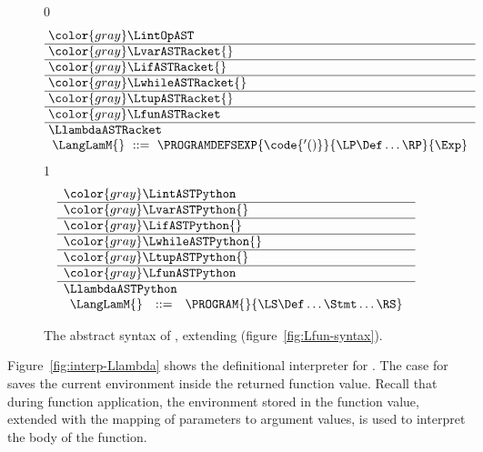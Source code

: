 \documentclass[7x10]{TimesAPriori_MIT}%
\newcommand{\gray}[1]{{\color{gray} #1}}
\def\racketEd{0}
\def\pythonEd{1}
\def\edition{1}
\newcommand{\pythonColor}[0]{}
\numberwithin{theorem}{chapter}
\numberwithin{definition}{chapter}
\numberwithin{equation}{chapter}
\begin{document}
\begin{figure}[tp]
\centering
\begin{tcolorbox}[colback=white]
    \small
{\if\edition\racketEd
\[\arraycolsep=3pt
\begin{array}{l}
  \gray{\LintOpAST} \\ \hline
  \gray{\LvarASTRacket{}} \\ \hline
  \gray{\LifASTRacket{}} \\ \hline
  \gray{\LwhileASTRacket{}} \\ \hline
  \gray{\LtupASTRacket{}} \\ \hline
  \gray{\LfunASTRacket} \\ \hline
  \LlambdaASTRacket \\
  \begin{array}{lcl}
  \LangLamM{} &::=& \PROGRAMDEFSEXP{\code{'()}}{\LP\Def\ldots\RP}{\Exp}
  \end{array}
\end{array}
\]
\fi}
{\if\edition\pythonEd\pythonColor
\[
\begin{array}{l}
  \gray{\LintASTPython} \\ \hline
  \gray{\LvarASTPython{}} \\ \hline
  \gray{\LifASTPython{}} \\ \hline
  \gray{\LwhileASTPython{}} \\ \hline
  \gray{\LtupASTPython{}} \\ \hline
  \gray{\LfunASTPython} \\ \hline
  \LlambdaASTPython \\
  \begin{array}{lcl}
  \LangLamM{} &::=& \PROGRAM{}{\LS \Def \ldots \Stmt \ldots \RS}
  \end{array}
\end{array}
\]
\fi}
\end{tcolorbox}

\caption{The abstract syntax of \LangLam{}, extending \LangFun{} (figure~\ref{fig:Lfun-syntax}).}
\label{fig:Llam-syntax}
\end{figure}

Figure~\ref{fig:interp-Llambda} shows the definitional
interpreter for \LangLam{}. The case for
 saves the current environment inside the returned
function value. Recall that during function application, the
environment stored in the function value, extended with the mapping of
parameters to argument values, is used to interpret the body of the
function.
\end{document}
